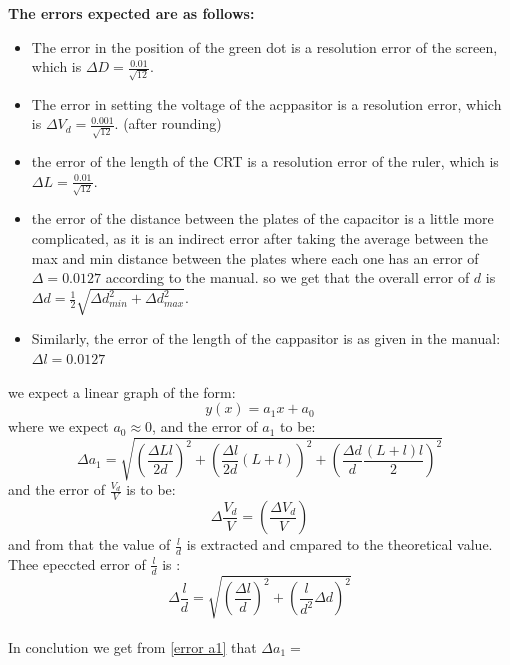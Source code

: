 \documentclass[12pt]{article}
\begin{document}
\textbf{The errors expected are as follows:}
\begin{itemize}
    \item The error in the position of the green dot is a resolution error of the screen, which is ${\Delta D = \frac{0.01}{\sqrt{12}}}$.
    \item The error in setting the voltage of the acppasitor is a resolution error, which is ${\Delta V_d = \frac{0.001}{\sqrt{12}}}$. (after rounding)
    \item the error of the length of the CRT is a resolution error of the ruler, which is $\Delta L = \frac{0.01}{\sqrt{12}}$.
    \item the error of the distance between the plates of the capacitor is a little more complicated, as it is an indirect error after taking the average between the max and min distance between the plates where each one has an error of $\Delta  = 0.0127$ according to the manual. so we get that the overall error of $d$ is $\Delta d = \frac{1}{2}\sqrt{\Delta d_{min}^2 + \Delta d_{max}^2}$.
    \item Similarly, the error of the length of the cappasitor is as given in the manual: $\Delta l = 0.0127$
\end{itemize}
we expect a linear graph of the form: 
\begin{equation}
    y(x) = a_1 x + a_0
\end{equation}
where we expect $a_0 \approx 0$, and the error of $a_1$  to be:
\begin{equation} \label{error a1}
    \Delta a_1 =  \sqrt{\left( \frac{\Delta L l }{2d}\right)^2 + \left(\frac{\Delta l}{2d}\left(L+l\right)\right)^2 + \left(\frac{\Delta d}{d} \frac{\left(L+l\right)l}{2}\right)^2}
\end{equation}
and the error of $\frac{V_d}{V}$ is to be:
\begin{equation} \label{error Vd}
    \Delta \frac{V_d}{V} = \left(\frac{\Delta V_d}{V}\right)
\end{equation}
and from that the value of $\frac l d$ is extracted and cmpared to the theoretical value.\\
Thee epeccted error of $\frac l d$ is :
\begin{equation} \label{error l/d}
    \Delta \frac l d = \sqrt{\left(\frac{\Delta l}{d}\right)^2 + \left(\frac{l}{d^2}\Delta d\right)^2}
\end{equation}\\

In conclution we get from \eqref{error a1} that $\Delta a_1 = $
 \\ 
\end{document}
